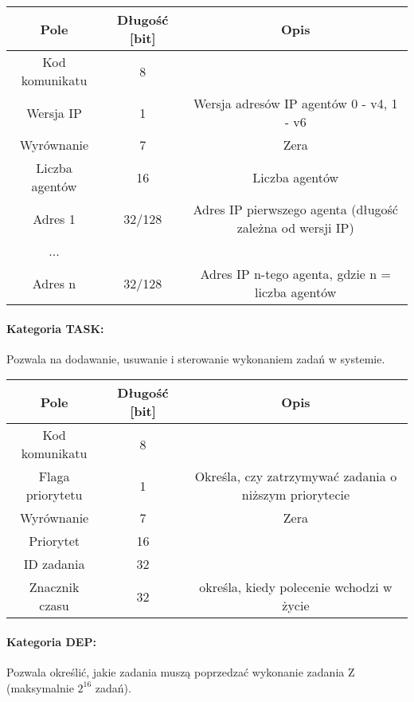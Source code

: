 \documentclass[10pt,a4paper]{article}
\begin{document}
            \begin{tabular}{ c | c | c }
			    \textbf{Pole} & \textbf{Długość [bit]} & \textbf{Opis} \\
			    \hline
			    Kod komunikatu & 8 & \\
			    Wersja IP & 1 & Wersja adresów IP agentów 0 - v4, 1 - v6 \\
			    Wyrównanie & 7 & Zera \\
			    Liczba agentów & 16 & Liczba agentów \\
			    Adres 1 & 32/128 & Adres IP pierwszego agenta (długość zależna od wersji IP) \\
			    ... &  &  \\
			    Adres n & 32/128 & Adres IP n-tego agenta, gdzie n = liczba agentów \\
			\end{tabular}
            
            \paragraph{Kategoria TASK:\\}
            Pozwala na dodawanie, usuwanie i sterowanie wykonaniem zadań w systemie. 
            
            \begin{tabular}{ c | c | c }
			    \textbf{Pole} & \textbf{Długość [bit]} & \textbf{Opis} \\
			    \hline
			    Kod komunikatu & 8 & \\
			    Flaga priorytetu & 1 & Określa, czy zatrzymywać zadania o niższym priorytecie \\
			    Wyrównanie & 7 & Zera \\
			    Priorytet & 16 & \\
			    ID zadania & 32 & \\
			    Znacznik czasu & 32 & określa, kiedy polecenie wchodzi w życie \\
			\end{tabular}
			
			\paragraph{Kategoria DEP:\\}
            Pozwala określić, jakie zadania muszą poprzedzać wykonanie zadania Z (maksymalnie $2^{16}$ zadań).
            
\end{document}
